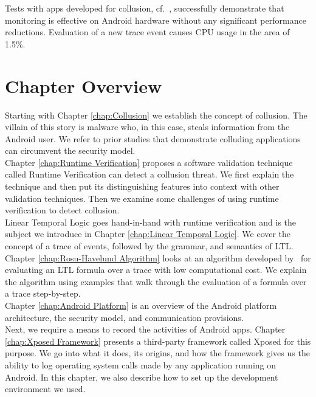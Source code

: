 Tests with apps developed for collusion, cf.\ \cite{DetectingMaliciousCollusion}, successfully demonstrate that monitoring is effective on Android hardware without any significant performance reductions.  Evaluation of a new trace event causes CPU usage in the area of 1.5\%.

\section{Chapter Overview}

\noindent Starting with Chapter \ref{chap:Collusion} we establish the concept of collusion.  The villain of this story is malware who, in this case, steals information from the Android user.  We refer to prior studies that demonstrate colluding applications can circumvent the security model.\\

\noindent Chapter \ref{chap:Runtime Verification} proposes a software validation technique called Runtime Verification can detect a collusion threat. We first explain the technique and then put its distinguishing features into context with other validation techniques. Then we examine some challenges of using runtime verification to detect collusion.\\

\noindent Linear Temporal Logic goes hand-in-hand with runtime verification and is the subject we introduce in Chapter \ref{chap:Linear Temporal Logic}.  We cover the concept of a trace of events, followed by the grammar, and semantics of LTL.\\

\noindent Chapter \ref{chap:Rosu-Havelund Algorithm} looks at an algorithm developed by \GRKH\ for evaluating an LTL formula over a trace with low computational cost.  We explain the algorithm using examples that walk through the evaluation of a formula over a trace step-by-step.\\

\noindent Chapter \ref{chap:Android Platform} is an overview of the Android platform architecture, the security model, and communication provisions.\\

\noindent Next, we require a means to record the activities of Android apps. Chapter \ref{chap:Xposed Framework} presents a third-party framework called Xposed for this purpose.  We go into what it does, its origins, and how the framework gives us the ability to log operating system calls made by any application running on Android.  In this chapter, we also describe how to set up the development environment we used.\\

